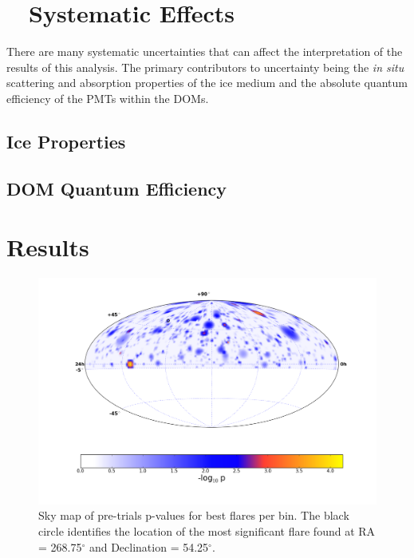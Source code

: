 \documentclass{gatech-thesis}
\begin{document}
\chapter{$\quad$Systematic Effects}
There are many systematic uncertainties that can affect the interpretation of the results of this analysis. The primary contributors to uncertainty being the \textit{in situ} scattering and absorption properties of the ice medium and the absolute quantum efficiency of the PMTs within the DOMs.

\section{Ice Properties}

\section{DOM Quantum Efficiency}

\chapter{Results}


\begin{figure}[ht]
  \begin{center}
    \includegraphics[width=1.0\textwidth,keepaspectratio]{RealResultSkyMap.png}
  \end{center}
  \caption{Sky map of pre-trials p-values for best flares per bin. The black circle identifies the location of the most significant flare found at RA = 268.75$^\circ$ and Declination = 54.25$^\circ$.}
  \label{fig:RealSkyMap}
\end{figure}
\end{document}
